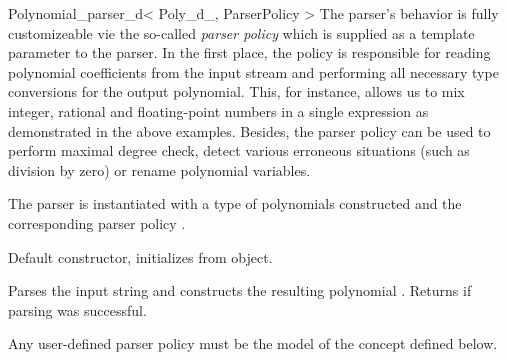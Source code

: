 \begin{ccRefClass}{Polynomial_parser_d< Poly_d_, ParserPolicy >}
The parser's behavior is fully customizeable vie the so-called {\em parser policy} 
which is supplied as a template parameter to the parser. 
In the first place, the policy is responsible for reading polynomial 
coefficients from the input stream and performing all necessary type conversions
for the output polynomial. This, for instance, allows us to mix integer, rational and 
floating-point numbers in a single expression as demonstrated in the above examples.
Besides, the parser policy can be used to perform maximal degree check,
detect various erroneous situations (such as division by zero) 
or rename polynomial variables.

\ccParameters
The parser is instantiated with a type 
of polynomials constructed  and the corresponding parser policy . 


\ccCreation
{}

% 

{Default constructor, initializes from  object.}

\ccOperations

{Parses the input string  and constructs the resulting polynomial . 
Returns  if parsing was successful.} 

Any user-defined parser policy must be the model of the 
concept defined below.
\end{ccRefClass}

